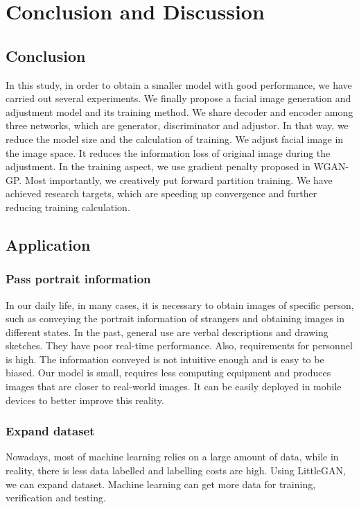 \section{Conclusion and Discussion}
\subsection{Conclusion}
In this study, in order to obtain a smaller model with good performance, we have carried out several experiments.
We finally propose a facial image generation and adjustment model and its training method.
We share decoder and encoder among three networks, which are generator, discriminator and adjustor.
In that way, we reduce the model size and the calculation of training.
We adjust facial image in the image space.
It reduces the information loss of original image during the adjustment.
In the training aspect, we use gradient penalty proposed in WGAN-GP.
Most importantly, we creatively put forward partition training.
We have achieved research targets, which are speeding up convergence and further reducing training calculation.

\subsection{Application}
\subsubsection*{Pass portrait information}
In our daily life, in many cases, it is necessary to obtain images of specific person,
    such as conveying the portrait information of strangers and obtaining images in different states.
In the past, general use are verbal descriptions and drawing sketches.
They have poor real-time performance.
Also, requirements for personnel is high.
The information conveyed is not intuitive enough and is easy to be biased.
Our model is small, requires less computing equipment and produces images that are closer to real-world images.
It can be easily deployed in mobile devices to better improve this reality.

\subsubsection*{Expand dataset}
Nowadays, most of machine learning relies on a large amount of data,
    while in reality, there is less data labelled and labelling costs are high.
Using LittleGAN, we can expand dataset.
Machine learning can get more data for training,
    verification and testing.

